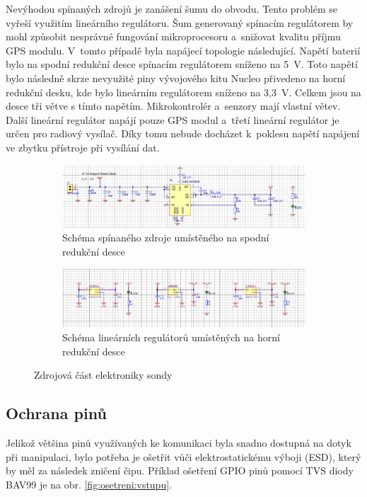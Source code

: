 \documentclass[twoside]{ctuthesis}
\theoremstyle{plain}
\theoremstyle{definition}
\theoremstyle{note}
\begin{document}
			Nevýhodou spínaných zdrojů je zanášení šumu do obvodu. Tento problém se vyřeší využitím lineárního regulátoru. Šum generovaný spínacím regulátorem by mohl způsobit nesprávné fungování mikroprocesoru a~snižovat kvalitu příjmu GPS modulu. V~tomto případě byla napájecí topologie následující. Napětí baterií bylo na spodní redukční desce spínacím regulátorem sníženo na 5~V. Toto napětí bylo následně skrze nevyužité piny vývojového kitu Nucleo přivedeno na horní redukční desku, kde bylo lineárním regulátorem sníženo na 3{,}3~V. Celkem jsou na desce tři větve s tímto napětím. Mikrokontrolér a~senzory mají vlastní větev. Další lineární regulátor napájí pouze GPS modul a~třetí lineární regulátor je určen pro radiový vysílač. Díky tomu nebude docházet k~poklesu napětí napájení ve zbytku přístroje při vysílání dat. 
			\begin{figure}
				\begin{subfigure}{\textwidth}
					\centering
					\includegraphics[width = \textwidth]{Figures/psu_bot.png}
					\caption{Schéma spínaného zdroje umístěného na spodní redukční desce}
					\label{fig:psu:bot}
				\end{subfigure}
				\begin{subfigure}{\textwidth}
					\centering
					\includegraphics[width = \textwidth]{Figures/psu_top.png}
					\caption{Schéma lineárních regulátorů umístěných na horní redukční desce}
					\label{fig:psu:top}
				\end{subfigure}
				\caption{Zdrojová část elektroniky sondy}
			\end{figure}
			


		\subsection{Ochrana pinů}
		Jelikož většina pinů využívaných ke komunikaci byla snadno dostupná na dotyk při manipulaci, bylo potřeba je ošetřit vůči elektrostatickému výboji (ESD), který by měl za následek zničení čipu. Příklad ošetření GPIO pinů pomocí TVS diody BAV99 je na obr. \ref{fig:osetreni:vstupu}.
		
\end{document}
